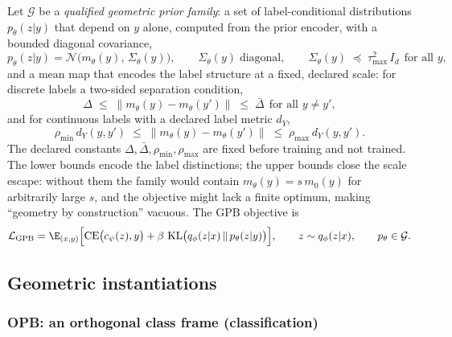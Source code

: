 \documentclass{article} %
\theoremstyle{plain}
\theoremstyle{remark}
\renewcommand{\KL}{\operatorname{KL}}
\DeclareMathOperator{\CE}{CE}
\begin{document}
Let $\mathcal{G}$ be a \emph{qualified geometric prior family}: a set of
label-conditional distributions $p_\theta(z|y)$ that depend on $y$ alone, computed
from the prior encoder, with a bounded diagonal covariance,
\begin{equation}
p_\theta(z|y) = \mathcal{N}\bigl(m_\theta(y),\, \Sigma_\theta(y)\bigr),
\qquad
\Sigma_\theta(y) \;\text{diagonal},
\qquad
\Sigma_\theta(y) \;\preceq\; \tau^2_{\max}\, I_d
\ \ \text{for all } y ,
\label{eq:pgib-covariance}
\end{equation}
and a mean map that encodes the label structure at a fixed, declared scale: for
discrete labels a two-sided separation condition,
\begin{equation}
\Delta \;\le\; \| m_\theta(y) - m_\theta(y') \| \;\le\; \bar\Delta
\ \ \text{for all } y \ne y' ,
\label{eq:pgib-separation-condition}
\end{equation}
and for continuous labels with a declared label metric $d_Y$,
\begin{equation}
\rho_{\min}\, d_Y(y, y') \;\le\; \| m_\theta(y) - m_\theta(y') \|
\;\le\; \rho_{\max}\, d_Y(y, y') .
\label{eq:pgib-lipschitz}
\end{equation}
The declared constants $\Delta, \bar\Delta, \rho_{\min}, \rho_{\max}$ are fixed before
training and not trained. The lower bounds encode the label distinctions; the upper
bounds close the scale escape: without them the family would contain
$m_\theta(y) = s\,m_0(y)$ for arbitrarily large $s$, and the objective might lack a
finite optimum, making ``geometry by construction'' vacuous. The GPB objective is
\begin{equation}
\mathcal{L}_{\mathrm{GPB}}
= \E_{(x,y)}\Bigl[
\CE\bigl(c_\psi(z), y\bigr)
+ \beta\, \KL\bigl(q_\phi(z|x) \,\|\, p_\theta(z|y)\bigr)
\Bigr],
\qquad z \sim q_\phi(z|x),
\qquad p_\theta \in \mathcal{G} .
\label{eq:pgib-objective}
\end{equation}

\subsection{Geometric instantiations}
\label{sec:variants}

\subsubsection{OPB: an orthogonal class frame (classification)}
\label{sec:opb}
\end{document}
